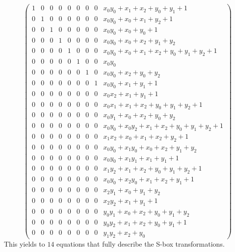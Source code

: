 \begin{equation}
    \label{eqn:sbox-equations}
    \left(
    \begin{array}{llllllllr}
        1 & 0 & 0 & 0 & 0 & 0 & 0 & 0 & x_0 y_0+ x_1+ x_2+ y_0+ y_1+ 1              \\
        0 & 1 & 0 & 0 & 0 & 0 & 0 & 0 & x_0 y_0+ x_0+ x_1+ y_2+ 1                   \\
        0 & 0 & 1 & 0 & 0 & 0 & 0 & 0 & x_0 y_0+ x_0+ y_0+ 1                        \\
        0 & 0 & 0 & 1 & 0 & 0 & 0 & 0 & x_0 y_0+ x_0+ x_2+ y_1+ y_2                 \\
        0 & 0 & 0 & 0 & 1 & 0 & 0 & 0 & x_0 y_0+ x_0+ x_1+ x_2+ y_0+ y_1+ y_2+ 1    \\
        0 & 0 & 0 & 0 & 0 & 1 & 0 & 0 & x_0 y_0                                     \\
        0 & 0 & 0 & 0 & 0 & 0 & 1 & 0 & x_0 y_0+ x_2+ y_0+ y_2                      \\
        0 & 0 & 0 & 0 & 0 & 0 & 0 & 1 & x_0 y_0+ x_1+ y_1+ 1                        \\
        0 & 0 & 0 & 0 & 0 & 0 & 0 & 0 & x_0 x_2+ x_1+ y_1+ 1                        \\
        0 & 0 & 0 & 0 & 0 & 0 & 0 & 0 & x_0 x_1+ x_1+ x_2+ y_0+ y_1+ y_2+ 1         \\
        0 & 0 & 0 & 0 & 0 & 0 & 0 & 0 & x_0 y_1+ x_0+ x_2+ y_0+ y_2                 \\
        0 & 0 & 0 & 0 & 0 & 0 & 0 & 0 & x_0 y_0+ x_0y_2+ x_1+ x_2+ y_0+ y_1+ y_2+ 1 \\
        0 & 0 & 0 & 0 & 0 & 0 & 0 & 0 & x_1 x_2+ x_0+ x_1+ x_2+ y_2+ 1              \\
        0 & 0 & 0 & 0 & 0 & 0 & 0 & 0 & x_0 y_0+ x_1y_0+ x_0+ x_2+ y_1+ y_2         \\
        0 & 0 & 0 & 0 & 0 & 0 & 0 & 0 & x_0 y_0+ x_1y_1+ x_1+ y_1+ 1                \\
        0 & 0 & 0 & 0 & 0 & 0 & 0 & 0 & x_1 y_2+ x_1+ x_2+ y_0+ y_1+ y_2+ 1         \\
        0 & 0 & 0 & 0 & 0 & 0 & 0 & 0 & x_0 y_0+ x_2y_0+ x_1+ x_2+ y_1+ 1           \\
        0 & 0 & 0 & 0 & 0 & 0 & 0 & 0 & x_2 y_1+ x_0+ y_1+ y_2                      \\
        0 & 0 & 0 & 0 & 0 & 0 & 0 & 0 & x_2 y_2+ x_1+ y_1+ 1                        \\
        0 & 0 & 0 & 0 & 0 & 0 & 0 & 0 & y_0 y_1+ x_0+ x_2+ y_0+ y_1+ y_2            \\
        0 & 0 & 0 & 0 & 0 & 0 & 0 & 0 & y_0 y_2+ x_1+ x_2+ y_0+ y_1+ 1              \\
        0 & 0 & 0 & 0 & 0 & 0 & 0 & 0 & y_1 y_2+ x_2+ y_0
    \end{array} \right)
\end{equation}
This yields to $14$ equations that fully describe the S-box transformations.

